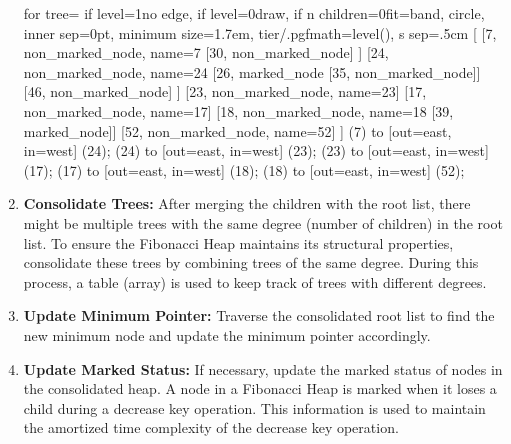 \documentclass[12pt, a4paper]{article}
\begin{document}
\begin{enumerate}
		\begin{minipage}{\linewidth} %
			\centering
			\begin{forest}
				for tree={
					if level=1{no edge}{}, 
					if level=0{}{draw},
					if n children=0{fit=band}{},
					circle, inner sep=0pt, minimum size=1.7em,
					tier/.pgfmath=level(), s sep=.5cm
				}
				[
				[7, non_marked_node, name=7
				[30, non_marked_node]
				]
				[24, non_marked_node, name=24
				[26, marked_node
				[35, non_marked_node]]
				[46, non_marked_node]
				]
				[23, non_marked_node, name=23]
				[17, non_marked_node, name=17]
				[18, non_marked_node, name=18
				[39, marked_node]]
				[52, non_marked_node, name=52]
				]
				 (7) to [out=east, in=west] (24);
				 (24) to [out=east, in=west] (23);
				 (23) to [out=east, in=west] (17);
				 (17) to [out=east, in=west] (18);
				 (18) to [out=east, in=west] (52);
			\end{forest}
			\label{fig:enter-label}
		\end{minipage} %
		
		\item \textbf{Consolidate Trees:} After merging the children with the root list, there might be multiple trees with the same degree (number of children) in the root list. To ensure the Fibonacci Heap maintains its structural properties, consolidate these trees by combining trees of the same degree. During this process, a table (array) is used to keep track of trees with different degrees.\\
		
		\item \textbf{Update Minimum Pointer:} Traverse the consolidated root list to find the new minimum node and update the minimum pointer accordingly.
		
		\item \textbf{Update Marked Status:} If necessary, update the marked status of nodes in the consolidated heap. A node in a Fibonacci Heap is marked when it loses a child during a decrease key operation. This information is used to maintain the amortized time complexity of the decrease key operation.
		

\end{enumerate}
\end{document}
